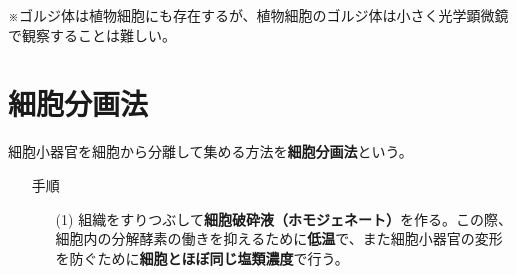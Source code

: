 \begin{flushright}{\small ※ゴルジ体は植物細胞にも存在するが、植物細胞のゴルジ体は小さく光学顕微鏡で観察することは難しい。}\end{flushright}
\section{細胞分画法}
細胞小器官を細胞から分離して集める方法を\textbf{細胞分画法}という。
\begin{itemize}\setlength{\leftskip}{-1.00zw}%
\item[\ajMaru{1}] 手順
  \begin{itemize}\setlength{\leftskip}{-1.00zw}%
  \item[(1)] 組織をすりつぶして\textbf{細胞破砕液（ホモジェネート）}を作る。この際、細胞内の分解酵素の働きを抑えるために\textbf{低温}で、また細胞小器官の変形を防ぐために\textbf{細胞とほぼ同じ塩類濃度}で行う。
  \end{itemize}

\end{itemize}
